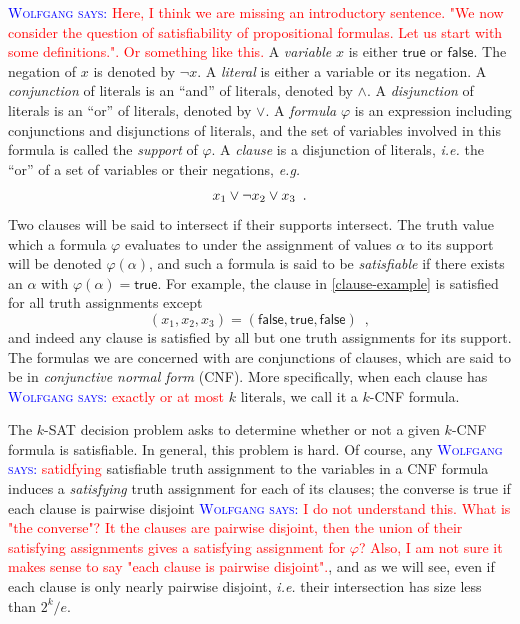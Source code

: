 \documentclass{patmorin}
\newcommand{\aremark}[3]{\textcolor{blue}{\textsc{#1 #2:}}
  \textcolor{red}{\textsf{#3}}}
\newcommand{\wolfgang}[2][says]{\aremark{Wolfgang}{#1}{#2}}
\begin{document}
\wolfgang{Here, I think we are missing an introductory sentence.
"We now consider the question of satisfiability of propositional
formulas. Let us start with some definitions.". Or something
like this.}
A \emph{variable} $x$ is either $\textsf{true}$ or
$\textsf{false}$. The negation of $x$ is denoted by $\neg x$. A
\emph{literal} is either a variable or its negation. A
\emph{conjunction} of literals is an ``and'' of literals, denoted by
$\land$. A \emph{disjunction} of literals is an ``or'' of literals,
denoted by $\lor$. A \emph{formula} $\varphi$ is an expression
including conjunctions and disjunctions of literals, and the set of
variables involved in this formula is called the \emph{support} of
$\varphi$. A \emph{clause} is a disjunction of literals, \emph{i.e.}
the ``or'' of a set of variables or their negations, \emph{e.g.}
\begin{align}
  x_1 \lor \neg x_2 \lor x_3 \enspace . \eqlabel{clause-example}
\end{align}
Two clauses will be said to intersect if their supports intersect. The
truth value which a formula $\varphi$ evaluates to under the
assignment of values $\alpha$ to its support will be denoted
$\varphi(\alpha)$, and such a formula is said to be \emph{satisfiable}
if there exists an $\alpha$ with $\varphi(\alpha) = \textsf{true}$. 
For example,
the clause in \eqref{clause-example} is satisfied for all truth
assignments except
\[
(x_1, x_2, x_3) = (\textsf{false}, \textsf{true}, \textsf{false}) \enspace ,
\]
and indeed any clause is satisfied by all but one truth assignments for
its support. The formulas we are concerned with are conjunctions of
clauses, which are said to be in \emph{conjunctive normal form}
(CNF). More specifically, when each clause has 
\wolfgang{exactly or at most} $k$ literals, we call
it a $k$-CNF formula.

The $k$-SAT decision problem asks to determine whether or not a given
$k$-CNF formula is satisfiable. In general, this problem is hard. Of
course, any \wolfgang{satidfying} satisfiable truth assignment to 
the variables in a CNF
formula induces a \emph{satisfying} truth assignment for each of its 
clauses; the
converse is true if each clause is pairwise disjoint
\wolfgang{I do not understand this. What is "the converse"?
It the clauses are pairwise disjoint, then the union of their
satisfying assignments gives a satisfying assignment for $\varphi$?
Also, I am not sure it makes sense to say "each clause is 
pairwise disjoint".}, 
and as we will
see, even if each clause is only nearly pairwise disjoint, \emph{i.e.}
their intersection has size less than $2^k/e$.
\end{document}
